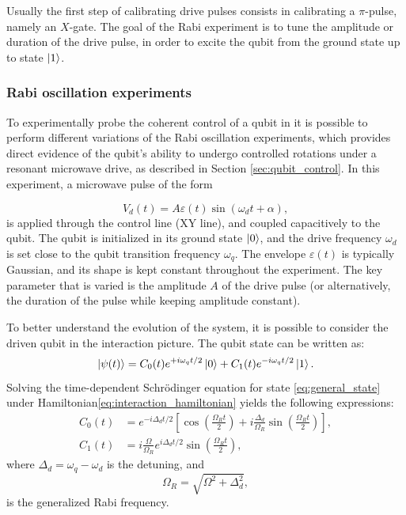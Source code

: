 Usually the first step of calibrating drive pulses consists in calibrating a $\pi$-pulse, namely an $X$-gate. 
The goal of the Rabi experiment is to tune the amplitude or duration of the drive pulse, in order to excite the qubit from the ground state up to state $\ket{1}$.

\subsubsection{Rabi oscillation experiments}
To experimentally probe the coherent control of a qubit in \Qibocal it is possible to perform different variations of the Rabi oscillation experiments, which provides direct evidence of the qubit's ability to undergo controlled rotations under a resonant microwave drive, as described in Section \ref{sec:qubit_control}.
In this experiment, a microwave pulse of the form  

\begin{equation}\label{eq:microwave_pulse}
    V_d(t) = A \varepsilon(t) \sin(\omega_d t + \alpha),
\end{equation}
is applied through the control line (XY line), and coupled capacitively to the qubit. 
The qubit is initialized in its ground state $\ket{0}$, and the drive frequency $\omega_d$ is set close to the qubit transition frequency $\omega_q$. 
The envelope $\varepsilon(t)$ is typically Gaussian, and its shape is kept constant throughout the experiment. 
The key parameter that is varied is the amplitude $A$ of the drive pulse (or alternatively, the duration of the pulse while keeping amplitude constant).

To better understand the evolution of the system, it is possible to consider the driven qubit in the interaction picture. 
The qubit state can be written as:
\begin{equation}\label{eq:general_state}
    \ket{\psi(t)} = C_0(t) e^{+i \omega_q t/2} \ket{0} + C_1(t) e^{-i \omega_q t/2} \ket{1}.
\end{equation}
%
Solving the time-dependent Schr\"odinger equation for state \ref{eq:general_state} under Hamiltonian\ref{eq:interaction_hamiltonian} yields the following expressions:
\begin{align}
    C_0(t) &= e^{-i \Delta_d t / 2} \left[ \cos \left( \frac{\Omega_R t}{2} \right) + i \frac{\Delta_d}{\Omega_R} \sin \left( \frac{\Omega_R t}{2} \right) \right], \\
    C_1(t) &= i \frac{\Omega}{\Omega_R} e^{i \Delta_d t / 2} \sin \left( \frac{\Omega_R t}{2} \right),
\end{align}
where $\Delta_d = \omega_q - \omega_d$ is the detuning, and
\begin{equation}
    \Omega_R = \sqrt{\Omega^2 + \Delta_d^2},
\end{equation}
is the generalized Rabi frequency.

